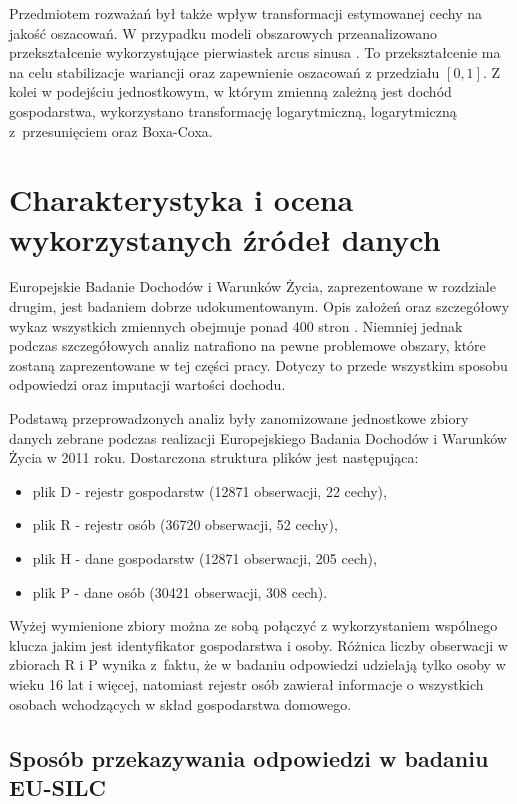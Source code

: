 Przedmiotem rozważań był także wpływ transformacji estymowanej cechy na jakość oszacowań. W przypadku modeli obszarowych przeanalizowano przekształcenie wykorzystujące pierwiastek arcus sinusa \citep{analpovdata52016}. To przekształcenie ma na celu stabilizacje wariancji oraz zapewnienie oszacowań z przedziału $[0,1]$. Z kolei w podejściu jednostkowym, w którym zmienną zależną jest dochód gospodarstwa, wykorzystano transformację logarytmiczną, logarytmiczną z~przesunięciem oraz Boxa-Coxa.

\section{Charakterystyka i ocena wykorzystanych źródeł danych}

Europejskie Badanie Dochodów i Warunków Życia, zaprezentowane w rozdziale drugim, jest badaniem dobrze udokumentowanym. Opis założeń oraz szczegółowy wykaz wszystkich zmiennych obejmuje ponad 400 stron \citep{silc2011}. Niemniej jednak podczas szczegółowych analiz natrafiono na pewne problemowe obszary, które zostaną zaprezentowane w tej części pracy. Dotyczy to przede wszystkim sposobu odpowiedzi oraz imputacji wartości dochodu.

Podstawą przeprowadzonych analiz były zanomizowane jednostkowe zbiory danych zebrane podczas realizacji Europejskiego Badania Dochodów i Warunków Życia w 2011 roku. Dostarczona struktura plików jest następująca:

\begin{itemize}
\item plik D - rejestr gospodarstw (12871 obserwacji, 22 cechy),
\item plik R - rejestr osób (36720 obserwacji, 52 cechy),
\item plik H - dane gospodarstw (12871 obserwacji, 205 cech),
\item plik P - dane osób (30421 obserwacji, 308 cech).
\end{itemize}

Wyżej wymienione zbiory można ze sobą połączyć z wykorzystaniem wspólnego klucza jakim jest identyfikator gospodarstwa i osoby. Różnica liczby obserwacji w zbiorach R i P wynika z~faktu, że w badaniu odpowiedzi udzielają tylko osoby w wieku 16 lat i więcej, natomiast rejestr osób zawierał informacje o wszystkich osobach wchodzących w skład gospodarstwa domowego.

\subsection{Sposób przekazywania odpowiedzi w badaniu EU-SILC}

